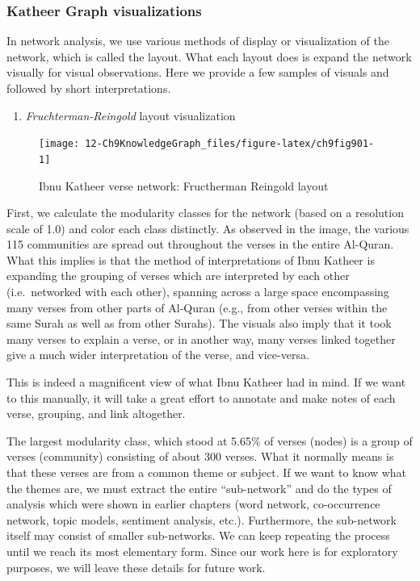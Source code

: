 \documentclass[
]{article}
\providecommand{\tightlist}{%
  \setlength{\itemsep}{0pt}\setlength{\parskip}{0pt}}
\begin{document}
\hypertarget{katheer-graph-visualizations}{%
\subsubsection{Katheer Graph visualizations}\label{katheer-graph-visualizations}}

In network analysis, we use various methods of display or visualization of the network, which is called the layout. What each layout does is expand the network visually for visual observations. Here we provide a few samples of visuals and followed by short interpretations.

\begin{enumerate}
\def\labelenumi{\arabic{enumi}.}
\tightlist
\item
  \emph{Fruchterman-Reingold} layout visualization
\end{enumerate}

\begin{figure}

{\centering \texttt{[image: 12-Ch9KnowledgeGraph\_files/figure-latex/ch9fig901-1]} 

}

\caption{Ibnu Katheer verse network: Fructherman Reingold layout}\label{fig:ch9fig901}
\end{figure}

First, we calculate the modularity classes for the network (based on a resolution scale of 1.0) and color each class distinctly. As observed in the image, the various 115 communities are spread out throughout the verses in the entire Al-Quran. What this implies is that the method of interpretations of Ibnu Katheer is expanding the grouping of verses which are interpreted by each other (i.e.~networked with each other), spanning across a large space encompassing many verses from other parts of Al-Quran (e.g., from other verses within the same Surah as well as from other Surahs). The visuals also imply that it took many verses to explain a verse, or in another way, many verses linked together give a much wider interpretation of the verse, and vice-versa.

This is indeed a magnificent view of what Ibnu Katheer had in mind. If we want to this manually, it will take a great effort to annotate and make notes of each verse, grouping, and link altogether.

The largest modularity class, which stood at 5.65\% of verses (nodes) is a group of verses (community) consisting of about 300 verses. What it normally means is that these verses are from a common theme or subject. If we want to know what the themes are, we must extract the entire ``sub-network'' and do the types of analysis which were shown in earlier chapters (word network, co-occurrence network, topic models, sentiment analysis, etc.). Furthermore, the sub-network itself may consist of smaller sub-networks. We can keep repeating the process until we reach its most elementary form. Since our work here is for exploratory purposes, we will leave these details for future work.
\end{document}
